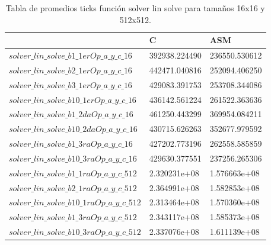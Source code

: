 \begin{table}[htbp]
\begin{center}
\begin{tabular}{|l|l|l|}
\hline
  & C & ASM\\
\hline \hline
$solver\_lin\_solve\_b1\_1erOp\_a\_y\_c\_16$ & 392938.224490 & 236550.530612\\ \hline

$solver\_lin\_solve\_b2\_1erOp\_a\_y\_c\_16$ & 442471.040816 & 252094.406250\\ \hline

$solver\_lin\_solve\_b3\_1erOp\_a\_y\_c\_16$ & 429083.391753 & 253708.344086\\ \hline

$solver\_lin\_solve\_b10\_1erOp\_a\_y\_c\_16$ & 436142.561224  & 261522.363636\\ \hline


$solver\_lin\_solve\_b1\_2daOp\_a\_y\_c\_16$ & 461250.443299 & 369954.084211\\ \hline

$solver\_lin\_solve\_b10\_2daOp\_a\_y\_c\_16$ & 430715.626263 & 352677.979592\\ \hline

$solver\_lin\_solve\_b1\_3raOp\_a\_y\_c\_16$ & 427202.773196  & 262558.585859\\ \hline


$solver\_lin\_solve\_b10\_3raOp\_a\_y\_c\_16$ & 429630.377551    & 237256.265306\\ \hline

\hline \hline 


$solver\_lin\_solve\_b1\_1raOp\_a\_y\_c\_512$ & 2.320231e+08  & 1.576663e+08\\ \hline

$solver\_lin\_solve\_b2\_1raOp\_a\_y\_c\_512$ & 2.364991e+08  &  1.582853e+08\\ \hline

$solver\_lin\_solve\_b10\_1raOp\_a\_y\_c\_512$ & 2.313464e+08   &  1.570360e+08\\ \hline

$solver\_lin\_solve\_b1\_3raOp\_a\_y\_c\_512$ & 2.343117e+08  & 1.585373e+08\\ \hline

$solver\_lin\_solve\_b10\_3raOp\_a\_y\_c\_512$ & 2.337076e+08 & 1.611139e+08\\ \hline

\end{tabular}
\caption{Tabla de promedios ticks función solver lin solve para tamaños 16x16 y 512x512.}
\end{center}
\end{table}
